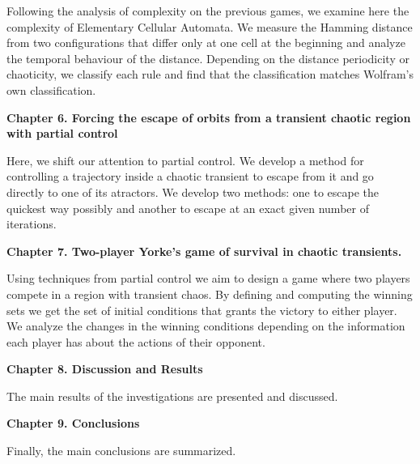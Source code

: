 \vspace{0.6cm}

Following the analysis of complexity on the previous games, we examine here the complexity of Elementary Cellular Automata. We measure the Hamming distance from two configurations that differ only at one cell at the beginning and analyze the temporal behaviour of the distance. Depending on the distance periodicity or chaoticity, we classify each rule and find that the classification matches Wolfram's own classification.

\vspace{0.6cm}

{\bf  Chapter 6. Forcing the escape of orbits from a transient chaotic region with partial control} 

\vspace{0.6cm}

Here, we shift our attention to partial control. We develop a method for controlling a trajectory inside a chaotic transient to escape from it and go directly to one of its atractors. We develop two methods: one to escape the quickest way possibly and another to escape at an exact given number of iterations.

\vspace{0.6cm}


{\bf  Chapter 7. Two-player Yorke's game of survival in chaotic transients.}

\vspace{0.6cm}

Using techniques from partial control we aim to design a game where two players compete in a region with transient chaos. By defining and computing the winning sets we get the set of initial conditions that grants the victory to either player. We analyze the changes in the winning conditions depending on the information each player has about the actions of their opponent.


\vspace{0.6cm}

{\bf  Chapter 8. Discussion and Results}

\vspace{0.6cm}

The main results of the investigations are presented and discussed.


\vspace{0.6cm}

{\bf  Chapter 9. Conclusions}

\vspace{0.6cm}

Finally, the main conclusions are summarized.